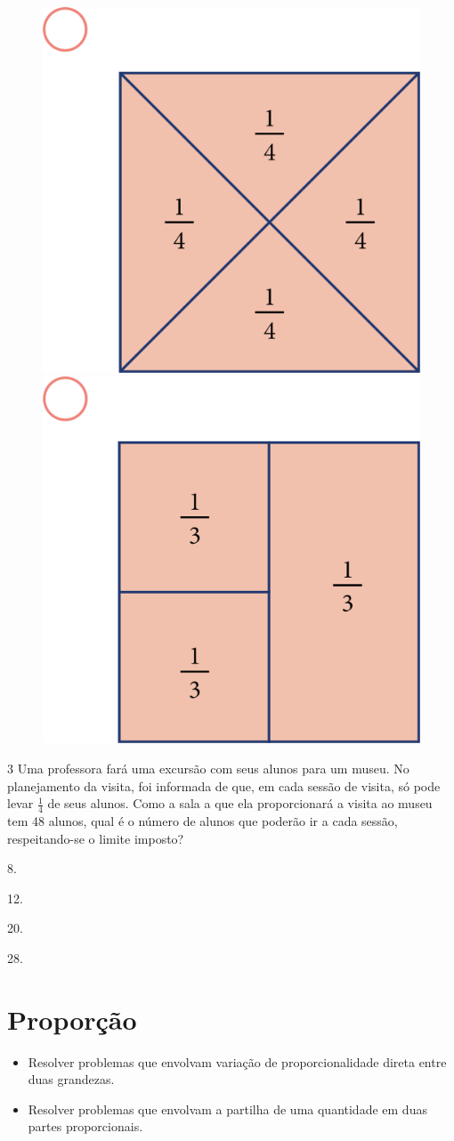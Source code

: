 \begin{figure}[htpb!]
\includegraphics[width=.3\textwidth]{media/image68.png}
\includegraphics[width=.3\textwidth]{media/image69.png}
\end{figure}

\num{3} Uma professora fará uma excursão com seus alunos para um museu. No
planejamento da visita, foi informada de que, em cada sessão de visita, só
pode levar $\frac{1}{4}$ de seus alunos. Como a sala a que ela proporcionará a
visita ao museu tem 48 alunos, qual é o número de alunos que poderão ir a
cada sessão, respeitando-se o limite imposto?

\begin{escolha}
\item
  8.

\item
  12.

\item
  20.

\item
  28.
\end{escolha}

\chapter{Proporção}


\begin{itemize}
\item Resolver problemas que envolvam variação de proporcionalidade direta
entre duas grandezas.

\item Resolver problemas que envolvam a partilha de uma quantidade em duas
partes proporcionais.
\end{itemize}

